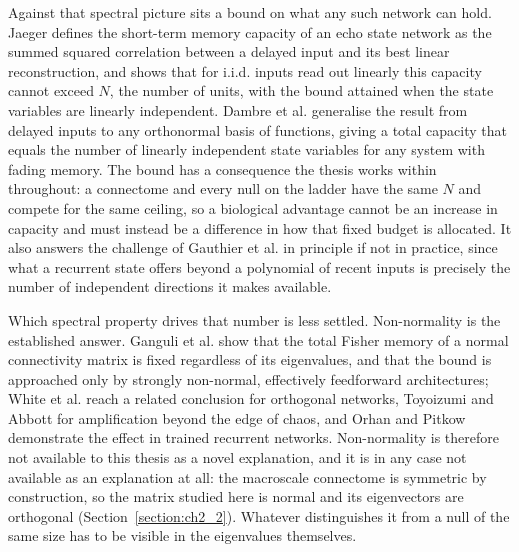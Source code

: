 Against that spectral picture sits a bound on what any such network can hold. Jaeger
\cite{jaeger2001short} defines the short-term memory capacity of an echo state network as
the summed squared correlation between a delayed input and its best linear reconstruction,
and shows that for i.i.d. inputs read out linearly this capacity cannot exceed $N$, the
number of units, with the bound attained when the state variables are linearly independent.
Dambre et al. \cite{dambre2012information} generalise the result from delayed inputs to any
orthonormal basis of functions, giving a total capacity that equals the number of linearly
independent state variables for any system with fading memory. The bound has a consequence
the thesis works within throughout: a connectome and every null on the ladder have the same
$N$ and compete for the same ceiling, so a biological advantage cannot be an increase in
capacity and must instead be a difference in how that fixed budget is allocated. It also
answers the challenge of Gauthier et al. \cite{gauthier2021next} in principle if not in
practice, since what a recurrent state offers beyond a polynomial of recent inputs is
precisely the number of independent directions it makes available.
 
Which spectral property drives that number is less settled. Non-normality is the
established answer. Ganguli et al. \cite{ganguli2008memory} show that the total Fisher
memory of a normal connectivity matrix is fixed regardless of its eigenvalues, and that the
bound is approached only by strongly non-normal, effectively feedforward architectures;
White et al. \cite{white2004short} reach a related conclusion for orthogonal networks,
Toyoizumi and Abbott \cite{toyoizumi2011beyond} for amplification beyond the edge of chaos,
and Orhan and Pitkow \cite{orhan2020improved} demonstrate the effect in trained recurrent
networks. Non-normality is therefore not available to this thesis as a novel explanation,
and it is in any case not available as an explanation at all: the macroscale connectome is
symmetric by construction, so the matrix studied here is normal and its eigenvectors are
orthogonal (Section~\ref{section:ch2_2}). Whatever distinguishes it from a null of the same
size has to be visible in the eigenvalues themselves.
 
